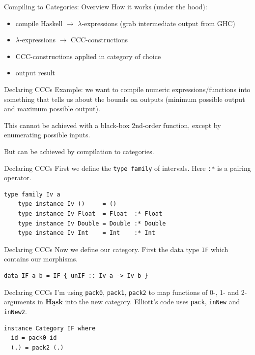 \documentclass[10pt]{beamer}
\newcommand{\Cat}[1]{\ensuremath{\underline{\mathbf{#1}}}}
\theoremstyle{definition}
\theoremstyle{remark}
\numberwithin{equation}{section}
\begin{document}
\begin{frame}[fragile]{Compiling to Categories: Overview}
  How it works (under the hood):
  \begin{itemize}
  \item compile Haskell $\rightarrow$ $\lambda$-expressions (grab intermediate output from GHC)
  \item $\lambda$-expressions $\rightarrow$ CCC-constructions
  \item CCC-constructions applied in category of choice
  \item output result
  \end{itemize}
\end{frame}

\begin{frame}[fragile]{Declaring CCCs}
  Example: we want to compile numeric expressions/functions into something that tells us about the bounds on outputs (minimum possible output and maximum possible output).

  This cannot be achieved with a black-box 2nd-order function, except by enumerating possible inputs.

  But can be achieved by compilation to categories.
\end{frame}

\begin{frame}[fragile]{Declaring CCCs}
  First we define the \lstinline{type family} of intervals. Here \lstinline{:*} is a pairing operator.
  \begin{lstlisting}[frame=single]
    type family Iv a
    type instance Iv ()     = ()
    type instance Iv Float  = Float  :* Float
    type instance Iv Double = Double :* Double
    type instance Iv Int    = Int    :* Int
  \end{lstlisting}
\end{frame}

\begin{frame}[fragile]{Declaring CCCs}
  Now we define our category. First the data type \lstinline{IF} which contains our morphisms.
  \begin{lstlisting}[frame=single]
    data IF a b = IF { unIF :: Iv a -> Iv b }
  \end{lstlisting}
\end{frame}

\begin{frame}[fragile]{Declaring CCCs}
  I'm using \lstinline{pack0}, \lstinline{pack1}, \lstinline{pack2} to map functions of 0-, 1- and 2-arguments in $\Cat{Hask}$ into the new category. Elliott's code uses \lstinline{pack}, \lstinline{inNew} and \lstinline{inNew2}.
  \begin{lstlisting}[frame=single]
instance Category IF where
  id = pack0 id
  (.) = pack2 (.)
  \end{lstlisting}
\end{frame}
\end{document}
